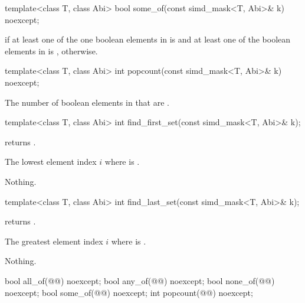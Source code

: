 \begin{itemdecl}
template<class T, class Abi> bool some_of(const simd_mask<T, Abi>& k) noexcept;
\end{itemdecl}

\begin{itemdescr}
  \pnum\returns
   if at least one of the one boolean elements in  is  and at least one of the boolean elements in  is ,  otherwise.
\end{itemdescr}

\begin{itemdecl}
template<class T, class Abi> int popcount(const simd_mask<T, Abi>& k) noexcept;
\end{itemdecl}

\begin{itemdescr}
  \pnum\returns
  The number of boolean elements in  that are .
\end{itemdescr}

\begin{itemdecl}
template<class T, class Abi> int find_first_set(const simd_mask<T, Abi>& k);
\end{itemdecl}

\begin{itemdescr}
  \pnum\requires
   returns .

  \pnum\returns
  The lowest element index $i$ where  is .

  \pnum\throws Nothing.
\end{itemdescr}

\begin{itemdecl}
template<class T, class Abi> int find_last_set(const simd_mask<T, Abi>& k);
\end{itemdecl}

\begin{itemdescr}
  \pnum\requires
   returns .

  \pnum\returns
  The greatest element index $i$ where  is .

  \pnum\throws Nothing.
\end{itemdescr}

\begin{itemdecl}
bool all_of(@@) noexcept;
bool any_of(@@) noexcept;
bool none_of(@@) noexcept;
bool some_of(@@) noexcept;
int popcount(@@) noexcept;
\end{itemdecl}

